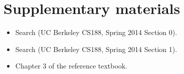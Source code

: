 \documentclass[11pt, a4paper]{article}
\begin{document}
\newpage

\section*{Supplementary materials}

\begin{itemize}
    \item Search (UC Berkeley CS188, Spring 2014 Section 0).
    
    
    \item Search (UC Berkeley CS188, Spring 2014 Section 1).
    
    
    \item Chapter 3 of the reference textbook.
\end{itemize}
    
\end{document}
